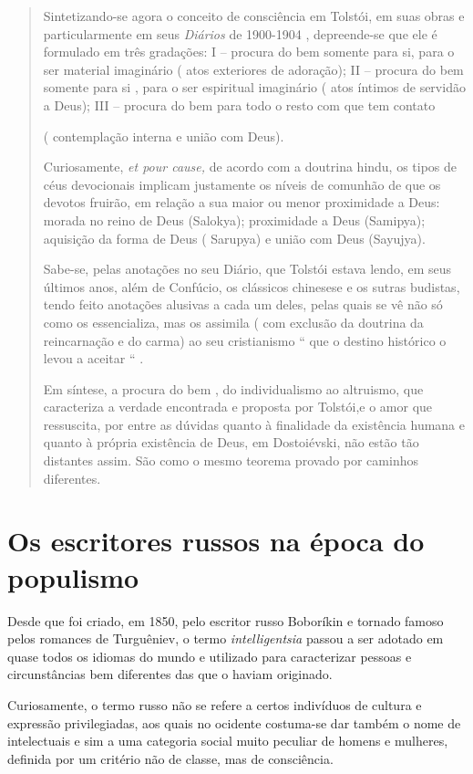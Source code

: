 \begin{quote}
Sintetizando-se agora o conceito de consciência em Tolstói, em suas
obras e particularmente em seus \emph{Diários} de 1900-1904 ,
depreende-se que ele é formulado em três gradações: I -- procura do bem
somente para si, para o ser material imaginário ( atos exteriores de
adoração); II -- procura do bem somente para si , para o ser espiritual
imaginário ( atos íntimos de servidão a Deus); III -- procura do bem
para todo o resto com que tem contato

( contemplação interna e união com Deus).

Curiosamente, \emph{et pour cause,} de acordo com a doutrina hindu, os
tipos de céus devocionais implicam justamente os níveis de comunhão de
que os devotos fruirão, em relação a sua maior ou menor proximidade a
Deus: morada no reino de Deus (Salokya); proximidade a Deus (Samipya);
aquisição da forma de Deus ( Sarupya) e união com Deus (Sayujya).

Sabe-se, pelas anotações no seu Diário, que Tolstói estava lendo, em
seus últimos anos, além de Confúcio, os clássicos chinesese e os sutras
budistas, tendo feito anotações alusivas a cada um deles, pelas quais se
vê não só como os essencializa, mas os assimila ( com exclusão da
doutrina da reincarnação e do carma) ao seu cristianismo `` que o
destino histórico o levou a aceitar `` .

Em síntese, a procura do bem , do individualismo ao altruismo, que
caracteriza a verdade encontrada e proposta por Tolstói,e o amor que
ressuscita, por entre as dúvidas quanto à finalidade da existência
humana e quanto à própria existência de Deus, em Dostoiévski, não estão
tão distantes assim. São como o mesmo teorema provado por caminhos
diferentes.
\end{quote}

\chapter{Os escritores russos na época do populismo}

Desde que foi criado, em 1850, pelo escritor russo Boboríkin e tornado
famoso pelos romances de Turguêniev, o termo \emph{intelligentsia}
passou a ser adotado em quase todos os idiomas do mundo e utilizado para
caracterizar pessoas e circunstâncias bem diferentes das que o haviam
originado.

Curiosamente, o termo russo não se refere a certos indivíduos de cultura
e expressão privilegiadas, aos quais no ocidente costuma-se dar também o
nome de intelectuais e sim a uma categoria social muito peculiar de
homens e mulheres, definida por um critério não de classe, mas de
consciência.

